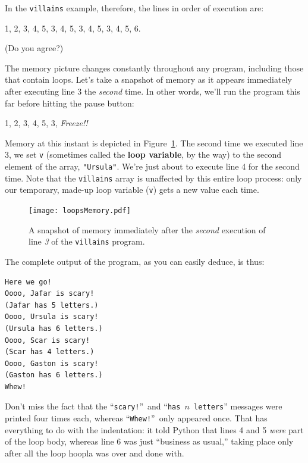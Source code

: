 In the \texttt{villains} example, therefore, the lines in order of execution
are:

\begin{center}
1, 2, 3, 4, 5, 3, 4, 5, 3, 4, 5, 3, 4, 5, 6.
\end{center}

(Do you agree?)

The memory picture changes constantly throughout any program, including those
that contain loops. Let's take a snapshot of memory as it appears immediately
after executing line 3 the \textit{second} time. In other words, we'll run the
program this far before hitting the pause button:

\begin{center}
1, 2, 3, 4, 5, 3, \textit{Freeze!!}
\end{center}


Memory at this instant is depicted in Figure~\ref{fig:loopsMemory}. The second
time we executed line 3, we set \texttt{v} (sometimes called the
\textbf{loop variable}, by the way) to the second element of the array,
\texttt{"Ursula"}. We're just about to execute line 4 for the second time. Note
that the \texttt{villains} array is unaffected by this entire loop process:
only our temporary, made-up loop variable (\texttt{v}) gets a new value
each time.

\begin{figure}[ht]
\centering
\texttt{[image: loopsMemory.pdf]}
\caption{A snapshot of memory immediately after the \textit{second} execution
of line \textit{3} of the \texttt{villains} program.}
\label{fig:loopsMemory}
\end{figure}

The complete output of the program, as you can easily deduce, is thus:

\begin{Verbatim}[fontsize=\small,samepage=true,frame=leftline,framesep=5mm,framerule=1mm]
Here we go!
Oooo, Jafar is scary!
(Jafar has 5 letters.)
Oooo, Ursula is scary!
(Ursula has 6 letters.)
Oooo, Scar is scary!
(Scar has 4 letters.)
Oooo, Gaston is scary!
(Gaston has 6 letters.)
Whew!
\end{Verbatim}

Don't miss the fact that the ``\texttt{scary!}''~and ``\texttt{has $n$
letters}'' messages were printed four times each, whereas
``\texttt{Whew!}''~only appeared once. That has everything to do with the
indentation: it told Python that lines 4 and 5 \textit{were} part of the loop
body, whereas line 6 was just ``business as usual,'' taking place only after
all the loop hoopla was over and done with.


